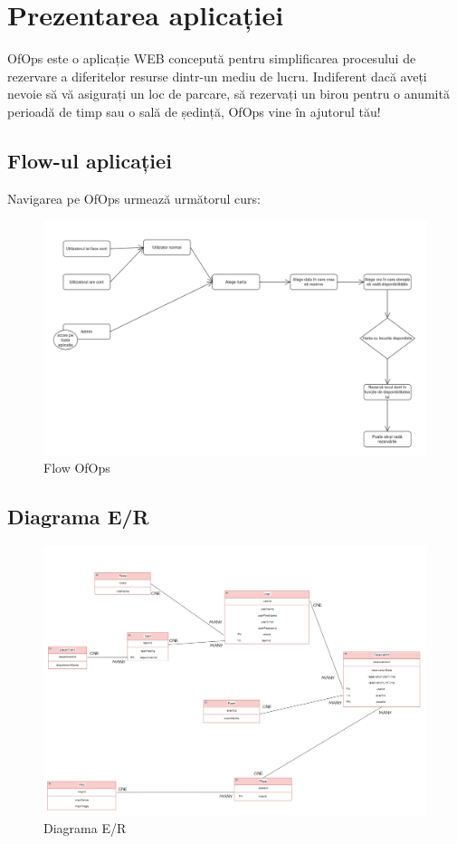 \chapter{Prezentarea aplicației}

OfOps este o aplicație WEB concepută pentru simplificarea procesului de rezervare a diferitelor resurse dintr-un mediu de lucru. Indiferent dacă aveți nevoie să vă asigurați un loc de parcare, să rezervați un birou pentru o anumită perioadă de timp sau o sală de ședință, OfOps vine în ajutorul tău!

\section{Flow-ul aplicației}

Navigarea pe OfOps urmează următorul curs:

\begin{figure}[!htb]
    \centering
    \includegraphics[width=0.9\linewidth]{images/flow.png}
    \caption{Flow OfOps}
    \label{fig:flow}
\end{figure}

\newpage

\section{Diagrama E/R}

\begin{figure}[!htb]
    \centering
    \includegraphics[width=0.9\linewidth]{images/diagrama.png}
    \caption{Diagrama E/R}
    \label{fig:diagrama}
\end{figure}

